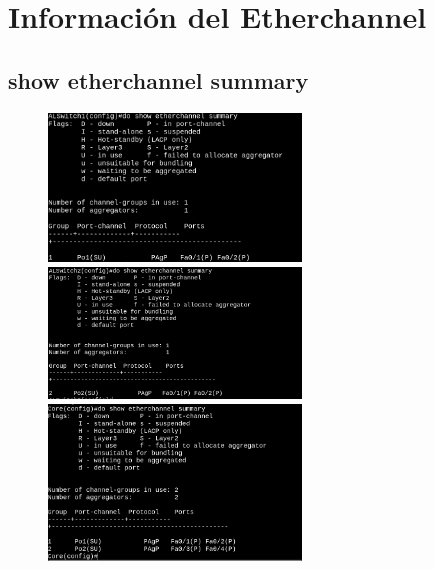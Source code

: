 \documentclass[letterpaper,12pt]{article}
\begin{document}
\begin{sloppypar}
\section{Información del Etherchannel}

\subsection{show etherchannel summary}
\begin{figure}[H]
    \centering 
    \includegraphics[width = 0.6\textwidth]{ether1.png}
    \vspace{0.3cm}\\ 
    \includegraphics[width=0.6\textwidth]{ether2.png}
    \vspace{0.3cm}\\ 
    \includegraphics[width=0.6\textwidth]{ether3.png}
\end{figure}


\end{sloppypar}
\end{document}
